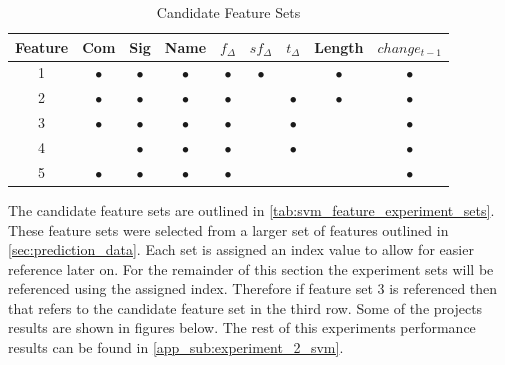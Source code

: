 \begin{table}[ht]
\begin{center}

    \begin{tabular}{|c|c|c|c|c|c|c|c|c|}
        \hline
        Feature & Com & Sig & Name & $f_{\Delta}$ & $sf_{\Delta}$ & $t_\Delta$ & Length & $change_{t-1}$ \\
         \hline
        1 & $\bullet$ & $\bullet$ & $\bullet$ & $\bullet$ & $\bullet$ & & $\bullet$ & $\bullet$ \\
        2 & $\bullet$ & $\bullet$ & $\bullet$ & $\bullet$ & & $\bullet$ & $\bullet$ & $\bullet$ \\
        3 & $\bullet$ & $\bullet$ & $\bullet$ & $\bullet$ & & $\bullet$ & & $\bullet$ \\
        4 & & $\bullet$ & $\bullet$ & $\bullet$ & & $\bullet$ & & $\bullet$ \\
        5 & $\bullet$ & $\bullet$ & $\bullet$ & $\bullet$ & & & & $\bullet$ \\ \hline
    \end{tabular}
    \caption{Candidate Feature Sets}
    \label{tab:svm_feature_experiment_sets}
\end{center}
\end{table}

The candidate feature sets are outlined in \autoref{tab:svm_feature_experiment_sets}. These feature sets were selected from a larger set of features outlined in \autoref{sec:prediction_data}. Each set is assigned an index value to allow for easier reference later on. For the remainder of this section the experiment sets will be referenced using the assigned index. Therefore if feature set 3 is referenced then that refers to the candidate feature set in the third row. Some of the projects results are shown in figures below. The rest of this experiments performance results can be found in \autoref{app_sub:experiment_2_svm}.


